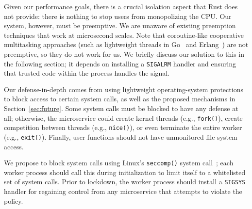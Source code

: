 Given our performance goals, there is a crucial isolation aspect that
Rust does not provide: there is nothing to stop users from monopolizing the CPU\@.
Our system, however, must be preemptive. We are unaware of existing preemption
techniques that work at microsecond scales. Note that coroutine-like
cooperative multitasking approaches (such as lightweight threads in
Go~\cite{www-golang} and Erlang~\cite{www-erlang}) are not preemptive, so they
do not work for us. We briefly discuss our solution to this in the following section;
it depends on installing a \texttt{SIGALRM} handler and ensuring that trusted
code within the process handles the signal.

Our defense-in-depth comes from using lightweight operating-system protections
to block access to certain system calls, as well as the proposed mechanisms
in Section~\ref{sec:future}.  Some system calls must be blocked to have any
defense at all; otherwise, the microservice could create kernel threads (e.g.,
\texttt{fork()}), create competition between threads (e.g., \texttt{nice()}), or even
terminate the entire worker (e.g., \texttt{exit()}). Finally, user functions should
not have unmonitored file system access.

We propose to block system calls using Linux's \texttt{seccomp()} system
call~\cite{seccomp-manpage}; each worker process should call this during
initialization to limit itself to a whitelisted set of system calls.
Prior to lockdown, the worker process should install a \texttt{SIGSYS} handler
for regaining control from any microservice that attempts to violate the policy.
